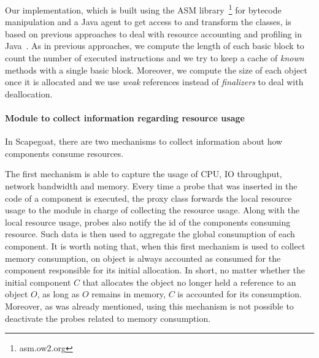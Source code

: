 Our implementation, which is built using the ASM library~\footnote{asm.ow2.org} for bytecode manipulation and a Java agent to get access to and transform the classes, is based on previous approaches to deal with resource accounting and profiling in Java~\cite{binder_portable_2006,Binder200645,czajkowski_jres:_1998}.
As in previous approaches, we compute the length of each basic block to count the number of executed instructions and we try to keep a cache of \textit{known} methods with a single basic block.
Moreover, we compute the size of each object once it is allocated and we use \textit{weak} references instead of \textit{finalizers} to deal with deallocation.

\paragraph{Module to collect information regarding resource usage}
In Scapegoat, there are two mechanisms to collect information about how components consume resources.

The first mechanism is able to capture the usage of CPU, IO throughput, network bandwidth and memory.
Every time a probe that was inserted in the code of a component is executed, the proxy class forwards the local resource usage to the module in charge of collecting the resource usage.
Along with the local resource usage, probes also notify the id of the components consuming resource.
Such data is then used to aggregate the global consumption of each component.
It is worth noting that, when this first mechanism is used to collect memory consumption, on object is always accounted as  consumed for the component responsible for its initial allocation.
In short, no matter whether the initial component $C$ that allocates the object no longer held a reference to an object $O$, as long as $O$ remains in memory, $C$ is accounted for its consumption.
Moreover, as was already mentioned, using this mechanism is not possible to deactivate the probes related to memory consumption.

